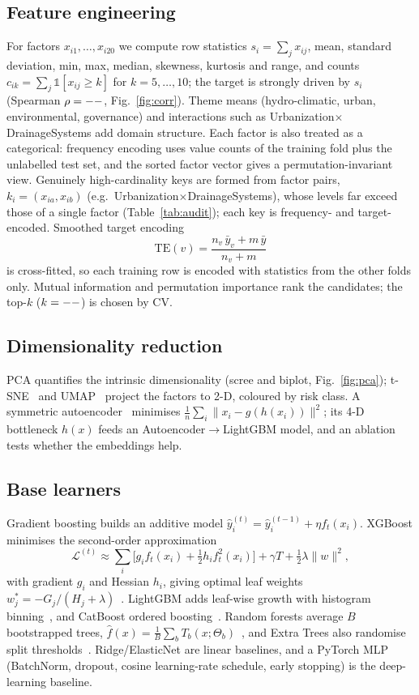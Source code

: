 \documentclass[conference]{IEEEtran}
\begin{document}
\subsection{Feature engineering}
For factors $x_{i1},\dots,x_{i20}$ we compute row statistics $s_i=\sum_j x_{ij}$, mean, standard deviation, min, max,
median, skewness, kurtosis and range, and counts $c_{ik}=\sum_j \mathbb{1}[x_{ij}\ge k]$ for $k=5,\dots,10$; the target is
strongly driven by $s_i$ (Spearman $\rho=--$, Fig.~\ref{fig:corr}). Theme means (hydro-climatic, urban,
environmental, governance) and interactions such as Urbanization$\times$DrainageSystems add domain structure. Each factor
is also treated as a categorical: frequency encoding uses value counts of the training fold plus the unlabelled test set,
and the sorted factor vector gives a permutation-invariant view. Genuinely high-cardinality keys are formed from factor
pairs, $k_i=(x_{ia},x_{ib})$ (e.g.\ Urbanization$\times$DrainageSystems), whose levels far exceed those of a single factor
(Table~\ref{tab:audit}); each key is frequency- and target-encoded. Smoothed target encoding
\begin{equation}
\mathrm{TE}(v)=\frac{n_v\,\bar y_v+m\,\bar y}{n_v+m}
\end{equation}
is cross-fitted, so each training row is encoded with statistics from the other folds only. Mutual information and
permutation importance rank the \FGNumEngineered{} candidates; the top-$k$ ($k=--$) is chosen by CV.

\subsection{Dimensionality reduction}
PCA quantifies the intrinsic dimensionality (scree and biplot, Fig.~\ref{fig:pca}); t-SNE~\cite{vandermaaten2008} and
UMAP~\cite{mcinnes2018} project the factors to 2-D, coloured by risk class. A symmetric autoencoder~\cite{hinton2006}
minimises $\frac{1}{n}\sum_i\lVert x_i-g(h(x_i))\rVert^2$; its 4-D bottleneck $h(x)$ feeds an Autoencoder$\to$LightGBM
model, and an ablation tests whether the embeddings help.

\subsection{Base learners}
Gradient boosting builds an additive model $\hat y_i^{(t)}=\hat y_i^{(t-1)}+\eta f_t(x_i)$. XGBoost minimises the
second-order approximation
\begin{equation}
\mathcal{L}^{(t)}\approx\sum_i\Big[g_i f_t(x_i)+\tfrac12 h_i f_t^2(x_i)\Big]+\gamma T+\tfrac12\lambda\lVert w\rVert^2,
\end{equation}
with gradient $g_i$ and Hessian $h_i$, giving optimal leaf weights $w_j^\ast=-G_j/(H_j+\lambda)$~\cite{chen2016}.
LightGBM adds leaf-wise growth with histogram binning~\cite{ke2017}, and CatBoost ordered boosting~\cite{prokhorenkova2018}.
Random forests average $B$ bootstrapped trees, $\hat f(x)=\frac1B\sum_b T_b(x;\Theta_b)$~\cite{breiman2001}, and Extra
Trees also randomise split thresholds~\cite{geurts2006}. Ridge/ElasticNet are linear baselines, and a PyTorch MLP
(BatchNorm, dropout, cosine learning-rate schedule, early stopping) is the deep-learning baseline.
\end{document}
